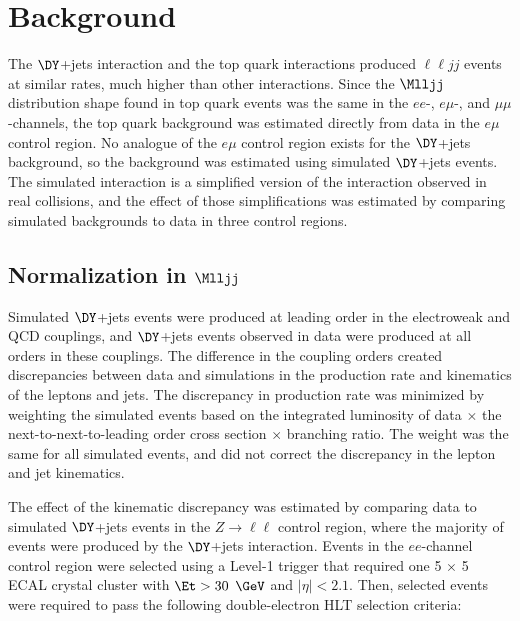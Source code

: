 \section{\DY Background}
\label{sec:dyBkgnd}
The $\DY$+jets interaction and the top quark interactions produced $\ell\ell jj$ events at similar rates, much higher than other 
interactions.  Since the $\Mlljj$ distribution shape found in top quark events was the same in the $ee$-, $e\mu$-, and $\mu\mu$-channels, 
the top quark background was estimated directly from data in the $e\mu$ control region.  No analogue of the $e\mu$ control region 
exists for the $\DY$+jets background, so the background was estimated using simulated $\DY$+jets events.  The simulated \DY interaction 
is a simplified version of the \DY interaction observed in real collisions, and the effect of those simplifications was estimated by 
comparing simulated backgrounds to data in three control regions.

\subsection{\DY Normalization in $\Mlljj$}
\label{sec:dyNormInMlljj}
Simulated $\DY$+jets events were produced at leading order in the electroweak and QCD couplings, and $\DY$+jets events observed in 
data were produced at all orders in these couplings.  The difference in the coupling orders created discrepancies between data and 
simulations in the production rate and kinematics of the leptons and jets.  The discrepancy in production rate was minimized by 
weighting the simulated events based on the integrated luminosity of data $\times$ the next-to-next-to-leading order \DY cross section 
$\times$ branching ratio.  The weight was the same for all simulated events, and did not correct the discrepancy in the lepton and jet 
kinematics.

The effect of the kinematic discrepancy was estimated by comparing data to simulated $\DY$+jets events in the $Z \rightarrow \ell\ell$ 
control region, where the majority of events were produced by the $\DY$+jets interaction.  Events in the $ee$-channel control region were 
selected using a Level-1 trigger that required one 5 $\times$ 5 ECAL crystal cluster with $\Et > 30$ $\GeV$ and $|\eta| < 2.1$.  Then, 
selected events were required to pass the following double-electron HLT selection criteria:

